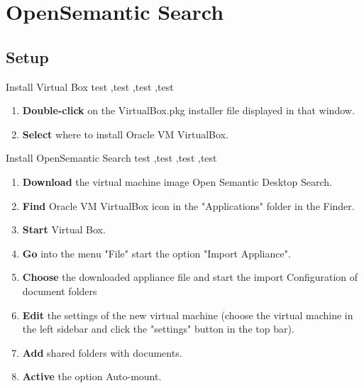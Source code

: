 \documentclass[10pt,a4paper]{article}
\begin{document}
\section{OpenSemantic Search}
\subsection{Setup}


\begin{textbox}{Install Virtual Box}
test  \sep test \sep test \sep test

\bigskip


\begin{enumerate}
\item \textbf {Double-click} on the VirtualBox.pkg installer file displayed in that window.
\item \textbf {Select} where to install Oracle VM VirtualBox.

\end{enumerate}


\end{textbox}

\begin{textbox}{Install OpenSemantic Search}
test  \sep test \sep test \sep test

\bigskip

\begin{enumerate}
\item \textbf{Download} the virtual machine image Open Semantic Desktop Search. 
\item \textbf {Find} Oracle VM VirtualBox icon in the "Applications" folder in the Finder.
\item \textbf{Start} Virtual Box.
\item \textbf{Go} into the menu "File" start the option "Import Appliance".
\item \textbf{Choose} the downloaded appliance file and start the import Configuration of document folders
\item \textbf{Edit} the settings of the new virtual machine (choose the virtual machine in the left sidebar and click the "settings" button in the top bar).
\item \textbf{Add} shared folders with documents.
\item \textbf{Active} the option Auto-mount.
\end{enumerate}

\end{textbox}
\end{document}
